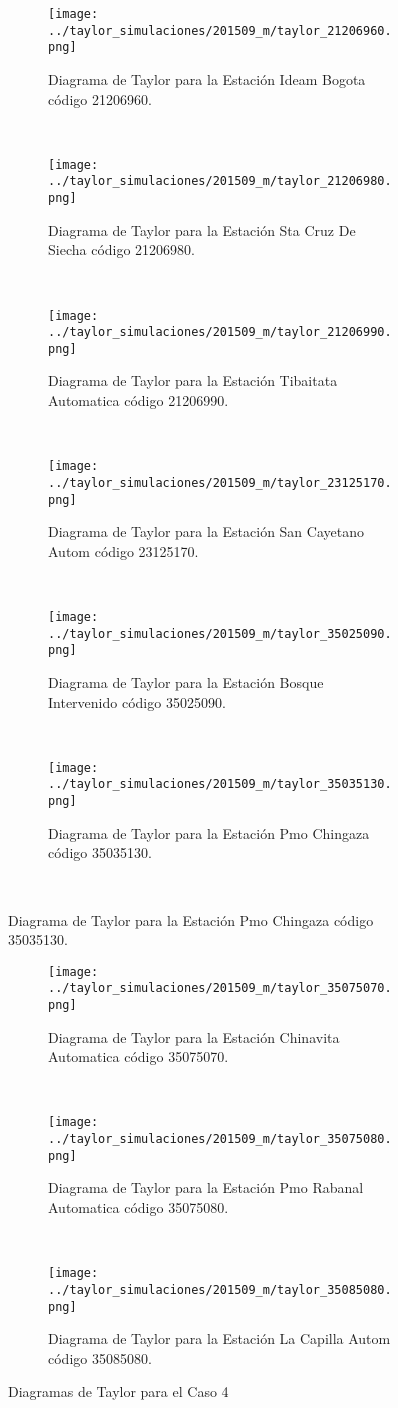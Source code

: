 \begin{figure}[H]\ContinuedFloat
\begin{subfigure}[normla]{0.5\textwidth}
\caption{Diagrama de Taylor para la Estación Ideam Bogota código 21206960.}
\texttt{[image: ../taylor\_simulaciones/201509\_m/taylor\_21206960.png]}
\end{subfigure}
~
\begin{subfigure}[normla]{0.5\textwidth}
\caption{Diagrama de Taylor para la Estación Sta Cruz De Siecha código 21206980.}
\texttt{[image: ../taylor\_simulaciones/201509\_m/taylor\_21206980.png]}
\end{subfigure}
~
\begin{subfigure}[normla]{0.5\textwidth}
\caption{Diagrama de Taylor para la Estación Tibaitata Automatica código 21206990.}
\texttt{[image: ../taylor\_simulaciones/201509\_m/taylor\_21206990.png]}
\end{subfigure}
~
\begin{subfigure}[normla]{0.5\textwidth}
\caption{Diagrama de Taylor para la Estación San Cayetano Autom  código 23125170.}
\texttt{[image: ../taylor\_simulaciones/201509\_m/taylor\_23125170.png]}
\end{subfigure}
~
\begin{subfigure}[normla]{0.5\textwidth}
\caption{Diagrama de Taylor para la Estación Bosque Intervenido   código 35025090.}
\texttt{[image: ../taylor\_simulaciones/201509\_m/taylor\_35025090.png]}
\end{subfigure}
~
\begin{subfigure}[normla]{0.5\textwidth}
\caption{Diagrama de Taylor para la Estación Pmo Chingaza código 35035130.}
\texttt{[image: ../taylor\_simulaciones/201509\_m/taylor\_35035130.png]}
\end{subfigure}
~
\end{figure}
           
\begin{figure}[H]\ContinuedFloat
\begin{subfigure}[normla]{0.5\textwidth}
\caption{Diagrama de Taylor para la Estación Chinavita Automatica código 35075070.}
\texttt{[image: ../taylor\_simulaciones/201509\_m/taylor\_35075070.png]}
\end{subfigure}
~
\begin{subfigure}[normla]{0.5\textwidth}
\caption{Diagrama de Taylor para la Estación Pmo Rabanal Automatica  código 35075080.}
\texttt{[image: ../taylor\_simulaciones/201509\_m/taylor\_35075080.png]}
\end{subfigure}
~
\begin{subfigure}[normla]{0.5\textwidth}
\caption{Diagrama de Taylor para la Estación La Capilla Autom código 35085080.}
\texttt{[image: ../taylor\_simulaciones/201509\_m/taylor\_35085080.png]}
\end{subfigure}



\caption{Diagramas de Taylor para el Caso 4}
\label{caso4}
\end{figure}

